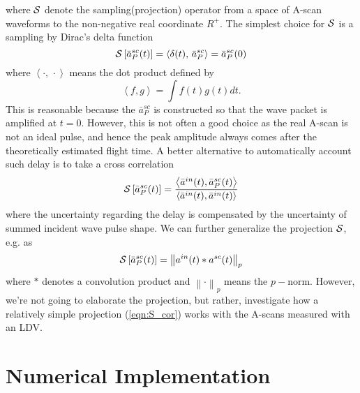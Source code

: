 ﻿\documentclass[11pt,a4j]{article}
\begin{document}
where ${\cal S}$ denote the sampling(projection) operator from a space of 
 A-scan waveforms to the non-negative real coordinate $R^{+}$.
 The simplest choice for $\cal S$ is a sampling by Dirac's delta function 
\begin{equation}
	{\cal S} \left[ 
		\bar{a}^{sc}_P(t) 
		\right]
	=\left<
	\delta(t),\, \bar{a}^{sc}_P
	\right>
	=
	\bar{a}^{sc}_P(0)
\end{equation}
where $\left<\cdot,\, \cdot \right>$ means the dot product defined by 
\begin{equation}
	\left< f,g \right>=\int f(t)g(t) dt.
	\label{eqn:}
\end{equation}
This is reasonable because the $\bar{a}^{sc}_P$ is constructed so that the 
wave packet is amplified at $t=0$. However, this is not often a good choice 
as the real A-scan is not an ideal pulse, and hence the peak amplitude 
always comes after the theoretically estimated flight time. 
A better alternative to automatically account such delay is to take a cross correlation 
\begin{equation}
	{\cal S} \left[ 
		\bar{a}^{sc}_P(t) 
		\right]
	=
	\frac{
		\left< 
			\bar{a}^{in}(t) 
			,\bar{a}^{sc}_P(t) 
		\right>
	}{
		\left<
			\bar{a}^{in}(t) 
			,
			\bar{a}^{in}(t) 
		\right>
	}
	\label{eqn:S_cor}
\end{equation}
where the uncertainty regarding the delay is compensated by the 
uncertainty of summed incident wave pulse shape.
We can further generalize the projection $\cal S$, e.g. as 
\begin{equation}
	{\cal S} \left[ 
		\bar{a}^{sc}_P(t) 
		\right]
	=
	\left\|a^{in}(t)*a^{sc}(t)\right\|_p
	\label{eqn:}
\end{equation}
where $*$ denotes a convolution product and $\left\| \cdot \right\|_p$ means the 
$p-$norm. However, we're not going to elaborate the projection, but rather, investigate 
how a relatively simple projection (\ref{eqn:S_cor}) works with the A-scans measured with an LDV. 
\section{Numerical Implementation}
\end{document}
